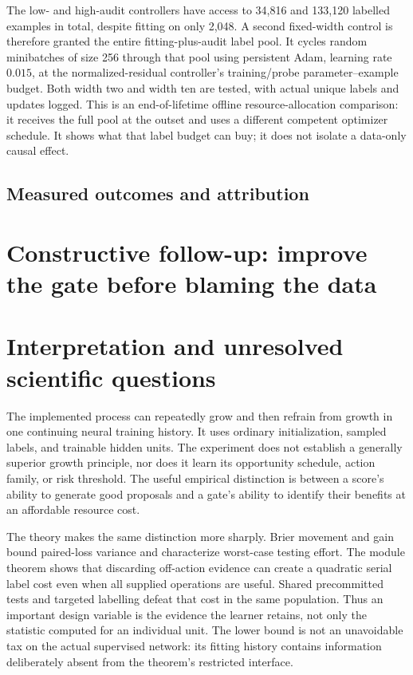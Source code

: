 \documentclass[11pt]{article}
\theoremstyle{remark}\newtheorem{remark}[theorem]{Remark}
\begin{document}
The low- and high-audit controllers have access to 34,816 and 133,120 labelled
examples in total, despite fitting on only 2,048. A second fixed-width control
is therefore granted the entire fitting-plus-audit label pool. It cycles
random minibatches of size 256 through that pool using persistent Adam,
learning rate $0.015$, at the normalized-residual controller's training/probe
parameter--example budget. Both width two and width ten are tested, with
actual unique labels and updates logged. This is an end-of-lifetime offline
resource-allocation comparison: it receives the full pool at the outset and
uses a different competent optimizer schedule. It shows what that label
budget can buy; it does not isolate a data-only causal effect. 

\subsection{Measured outcomes and attribution}


\section{Constructive follow-up: improve the gate before blaming the data}



\section{Interpretation and unresolved scientific questions}
\label{sec:limits}
The implemented process can repeatedly grow and then refrain from growth in
one continuing neural training history. It uses ordinary initialization,
sampled labels, and trainable hidden units. The experiment does not establish a
generally superior growth principle, nor does it learn its opportunity
schedule, action family, or risk threshold. The useful empirical distinction
is between a score's ability to generate good proposals and a gate's ability
to identify their benefits at an affordable resource cost.

The theory makes the same distinction more sharply. Brier movement and
gain bound paired-loss variance and characterize worst-case testing effort. The
module theorem shows that discarding off-action evidence can create a
quadratic serial label cost even when all supplied operations are useful.
Shared precommitted tests and targeted labelling defeat that cost in the
same population. Thus an important design variable is the evidence the
learner retains, not only the statistic computed for an individual unit.
The lower bound is not an unavoidable tax on the actual supervised network:
its fitting history contains information deliberately absent from the
theorem's restricted interface.
\end{document}
